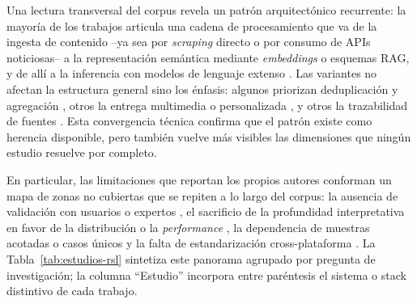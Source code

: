 \documentclass[12pt]{report}
\begin{document}
Una lectura transversal del corpus revela un patrón arquitectónico recurrente: la mayoría de los trabajos articula una cadena de procesamiento que va de la ingesta de contenido --ya sea por \textit{scraping} directo o por consumo de APIs noticiosas-- a la representación semántica mediante \textit{embeddings} o esquemas RAG, y de allí a la inferencia con modelos de lenguaje extenso \citep{neupane2025, behbahanian, somasundharam:2025, ameer:2025}. Las variantes no afectan la estructura general sino los énfasis: algunos priorizan deduplicación y agregación \citep{behbahanian}, otros la entrega multimedia o personalizada \citep{ameer:2025, begum:2024}, y otros la trazabilidad de fuentes \citep{somasundharam:2025}. Esta convergencia técnica confirma que el patrón existe como herencia disponible, pero también vuelve más visibles las dimensiones que ningún estudio resuelve por completo.

En particular, las limitaciones que reportan los propios autores conforman un mapa de zonas no cubiertas que se repiten a lo largo del corpus: la ausencia de validación con usuarios o expertos \citep{behbahanian, neupane2025}, el sacrificio de la profundidad interpretativa en favor de la distribución o la \textit{performance} \citep{ameer:2025, somasundharam:2025}, la dependencia de muestras acotadas o casos únicos \citep{pavlyshenko2024, samuel2025} y la falta de estandarización cross-plataforma \citep{haider2025}. La Tabla~\ref{tab:estudios-rsl} sintetiza este panorama agrupado por pregunta de investigación; la columna ``Estudio'' incorpora entre paréntesis el sistema o stack distintivo de cada trabajo.
\end{document}
